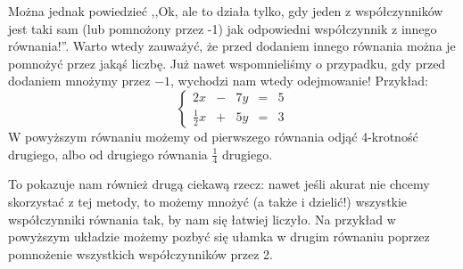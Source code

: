 \documentclass{article}
\theoremstyle{remark}
\begin{document}
Można jednak powiedzieć ,,Ok, ale to działa tylko, gdy jeden z
współczynników jest taki sam (lub pomnożony przez -1) jak odpowiedni
współczynnik z innego równania!''.
Warto wtedy zauważyć, że przed dodaniem innego równania można je
pomnożyć przez jakąś liczbę. Już nawet wspomnieliśmy o przypadku, gdy przed dodaniem
mnożymy przez $-1$, wychodzi nam wtedy odejmowanie! Przykład:
\begin{displaymath}
  \left\{
    \begin{array}{lllll}
      2x &-& 7y &=& 5\\
      \tfrac12x &+& 5y &=& 3
    \end{array}
    \right.
\end{displaymath}
W powyższym równaniu możemy od pierwszego równania odjąć 4-krotność drugiego,
albo od drugiego równania $\tfrac14$ drugiego.

To pokazuje nam również drugą ciekawą rzecz: nawet jeśli akurat nie chcemy skorzystać z
tej metody, to możemy mnożyć (a także i dzielić!) wszystkie współczynniki równania tak,
by nam się łatwiej liczyło. Na przykład w powyższym układzie możemy pozbyć się ułamka
w drugim równaniu poprzez pomnożenie wszystkich współczynników przez 2.
\end{document}
